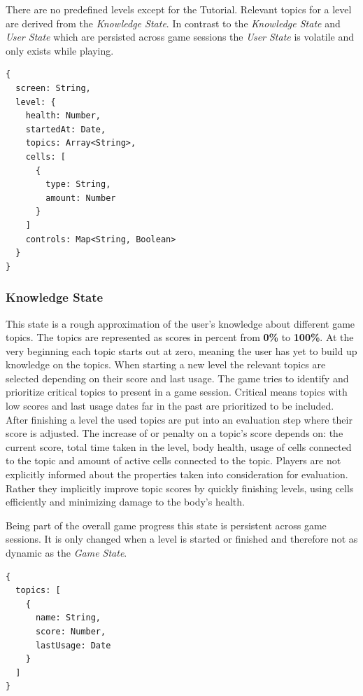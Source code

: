 There are no predefined levels except for the Tutorial. Relevant topics for a level are derived from the \textit{Knowledge State}. In contrast to the \textit{Knowledge State} and \textit{User State} which are persisted across game sessions the \textit{User State} is volatile and only exists while playing.

\begin{lstlisting}[caption={Pseudo TypeScript\protect\footnotemark code for Game State}]
{
  screen: String,
  level: {
    health: Number,
    startedAt: Date,
    topics: Array<String>,
    cells: [
      {
        type: String,
        amount: Number
      }
    ]
    controls: Map<String, Boolean>
  }
}
\end{lstlisting}

\subsubsection{Knowledge State} \label{knowledge-state}
This state is a rough approximation of the user's knowledge about different game topics. The topics are represented as scores in percent from \textbf{0\%} to \textbf{100\%}. At the very beginning each topic starts out at zero, meaning the user has yet to build up knowledge on the topics. When starting a new level the relevant topics are selected depending on their score and last usage. The game tries to identify and prioritize critical topics to present in a game session. Critical means topics with low scores and last usage dates far in the past are prioritized to be included. After finishing a level the used topics are put into an evaluation step where their score is adjusted. The increase of or penalty on a topic's score depends on: the current score, total time taken in the level, body health, usage of cells connected to the topic and amount of active cells connected to the topic. Players are not explicitly informed about the properties taken into consideration for evaluation. Rather they implicitly improve topic scores by quickly finishing levels, using cells efficiently and minimizing damage to the body's health.

Being part of the overall game progress this state is persistent across game sessions. It is only changed when a level is started or finished and therefore not as dynamic as the \textit{Game State}.

\begin{lstlisting}[caption={Pseudo TypeScript\protect\footnotemark code for Knowledge State}]
{
  topics: [
    {
      name: String,
      score: Number,
      lastUsage: Date
    }
  ]
}
\end{lstlisting}

